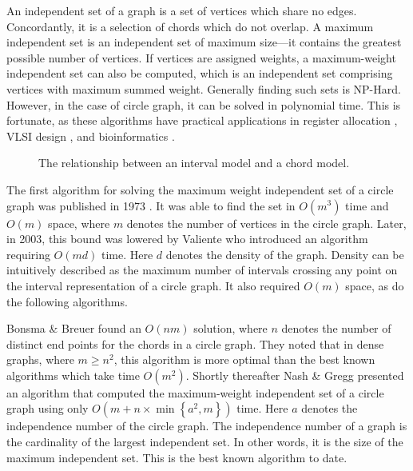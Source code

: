 \documentclass[12pt, a4paper]{article}
\begin{document}
An independent set of a graph is a set of vertices which share no edges. Concordantly, it is a selection of chords which do not overlap. A maximum independent set is an independent set of maximum size---it contains the greatest possible number of vertices. If vertices are assigned weights, a maximum-weight independent set can also be computed, which is an independent set comprising vertices with maximum summed weight. Generally finding such sets is NP-Hard. However, in the case of circle graph, it can be solved in polynomial time. This is fortunate, as these algorithms have practical applications in register allocation \cite{de1999graph}, VLSI design \cite{cong1990over}, and bioinformatics \cite{swenson2009maximum}.

\begin{figure}
\begin{center}
\end{center}
\caption{The relationship between an interval model and a chord model.}
\label{interval2circle}
\end{figure}

The first algorithm for solving the maximum weight independent set of a circle graph was published in 1973 \cite{gavril1973algorithms}. It was able to find the set in $O(m^3)$ time and $O(m)$ space, where $m$ denotes the number of vertices in the circle graph. Later, in 2003, this bound was lowered by Valiente \cite{valiente2003new} who introduced an algorithm requiring $O(md)$ time. Here $d$ denotes the density of the graph. Density can be intuitively described as the maximum number of intervals crossing any point on the interval representation of a circle graph.  It also required $O(m)$ space, as do the following algorithms.

Bonsma \& Breuer \cite{bonsma2012counting} found an $O(nm)$ solution, where $n$ denotes the number of distinct end points for the chords in a circle graph. They noted that in dense graphs, where $m \geq n^2$, this algorithm is more optimal than the best known algorithms which take time $O(m^2)$. Shortly thereafter Nash \& Gregg \cite{nash2013new} presented an algorithm that computed the maximum-weight independent set of a circle graph using only $O(m + n\times \min \left\lbrace a^2, m\right\rbrace)$ time. Here $a$ denotes the independence number of the circle graph. The independence number of a graph is the cardinality of the largest independent set. In other words, it is the size of the maximum independent set. This is the best known algorithm to date.
\end{document}
